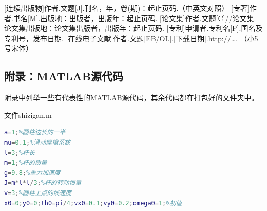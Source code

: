 \documentclass[UTF8,a4paper,12pt,twocolumn]{ctexart}
\begin{document}
\xiaowu\songti
\begin{thebibliography}{100}
	 [连续出版物]作者.文题[J].刊名，年，卷(期)：起止页码.（中英文对照）
	 [专著]作者.书名[M].出版地：出版者，出版年：起止页码.
	 [论文集]作者.文题[C]//论文集.论文集出版地：论文集出版者，出版年：起止页码.
	 [专利]申请者.专利名[P].国名及专利号，发布日期.
	 [在线电子文献]作者.文题[EB/OL].[下载日期].http://…. （小5号宋体）
\end{thebibliography}
%
%



\begin{onecolumn}
\section*{附录：MATLAB源代码}
附录中列举一些有代表性的MATLAB源代码，其余代码都在打包好的文件夹中。

文件shizigan.m
\begin{lstlisting}[language={Matlab},morekeywords={dsolve}]
a=1;%圆柱边长的一半
mu=0.1;%滑动摩擦系数
l=3;%杆长
m=1;%杆的质量
g=9.8;%重力加速度
J=m*l*l/3;%杆的转动惯量
v=3;%圆柱上点的线速度
x0=0;y0=0;th0=pi/4;vx0=0.1;vy0=0.2;omega0=1;%初值
\end{lstlisting}

%

\end{onecolumn}
\end{document}
